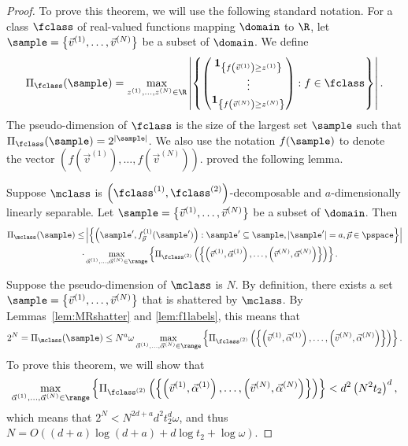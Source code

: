 \begin{proof}
To prove this theorem, we will use the following standard notation. For a class $\fclass$ of real-valued functions mapping $\domain$ to $\R$, let $\sample = \left\{\vec{v}^{(1)}, \dots, \vec{v}^{(N)}\right\}$ be a subset of $\domain$. We define
\[\Pi_{\fclass}(\sample) = \max_{z^{(1)}, \dots, z^{(N)} \in \R} \left|\left\{\begin{pmatrix}
\textbf{1}_{\left\{f\left(\vec{v}^{(1)}\right) \geq z^{(1)}\right\}}\\
\vdots\\
\textbf{1}_{\left\{f\left(\vec{v}^{(N)}\right) \geq z^{(N)}\right\}}
\end{pmatrix} : f \in \fclass\right\}\right|.\]
The pseudo-dimension of $\fclass$ is the size of the largest set $\sample$ such that $\Pi_{\fclass}(\sample) = 2^{|\sample|}$. We also use the notation $f(\sample)$ to denote the vector $\left(f(\vec{v}^{(1)}), \dots, f(\vec{v}^{(N)})\right)$. \citet{Morgenstern16:Learning} proved the following lemma.

\begin{lemma}\label{lem:MRshatter}
Suppose $\mclass$ is $\left(\fclass^{(1)}, \fclass^{(2)}\right)$-decomposable and $a$-dimensionally linearly separable. Let $\sample = \left\{\vec{v}^{(1)}, \dots, \vec{v}^{(N)}\right\}$ be a subset of $\domain$. Then \begin{align*}\Pi_{\mclass}(\sample) \leq &\left|\left\{\left(\sample', f^{(1)}_{\vec{p}}(\sample')\right) : \sample' \subseteq \sample, |\sample'| = a, \vec{p} \in \pspace \right\}\right|\\
\cdot &\max_{\vec{\alpha}^{(1)}, \dots, \vec{\alpha}^{(N)} \in \range} \left\{ \Pi_{\fclass^{(2)}} \left(\left\{ \left(\vec{v}^{(1)}, \vec{\alpha}^{(1)}\right), \dots, \left(\vec{v}^{(N)}, \vec{\alpha}^{(N)}\right)\right\}\right)\right\}.\end{align*}
\end{lemma}

Suppose the pseudo-dimension of $\mclass$ is $N$. By definition, there exists a set $\sample = \left\{\vec{v}^{(1)}, \dots, \vec{v}^{(N)}\right\}$ that is shattered by $\mclass$. By Lemmas~\ref{lem:MRshatter} and \ref{lem:f1labels}, this means that \[2^N = \Pi_{\mclass}(\sample) \leq N^a\omega \max_{\vec{\alpha}^{(1)}, \dots, \vec{\alpha}^{(N)} \in \range} \left\{ \Pi_{\fclass^{(2)}} \left(\left\{ \left(\vec{v}^{(1)}, \vec{\alpha}^{(1)}\right), \dots, \left(\vec{v}^{(N)}, \vec{\alpha}^{(N)}\right)\right\}\right)\right\}.\] To prove this theorem, we will show that \begin{equation}\max_{\vec{\alpha}^{(1)}, \dots, \vec{\alpha}^{(N)} \in \range} \left\{ \Pi_{\fclass^{(2)}} \left(\left\{ \left(\vec{v}^{(1)}, \vec{\alpha}^{(1)}\right), \dots, \left(\vec{v}^{(N)}, \vec{\alpha}^{(N)}\right)\right\}\right)\right\} < d^2 \left(N^2t_2\right)^d,\label{eq:shattering}\end{equation} which means that $2^N < N^{2d+a}d^2t_2^d\omega$, and thus $N= O\left((d+a) \log(d+a) + d \log t_2 + \log \omega\right)$.


\end{proof}

